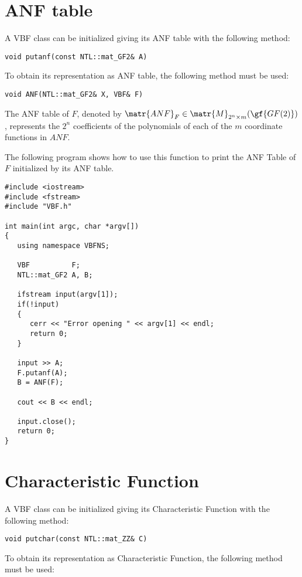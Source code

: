 \section{ANF table}

A VBF class can be initialized giving its ANF table with the following method:

\begin{verbatim}
void putanf(const NTL::mat_GF2& A)
\end{verbatim}

To obtain its representation as ANF table, the following method must be used:

\begin{verbatim}
void ANF(NTL::mat_GF2& X, VBF& F)
\end{verbatim}

The ANF table of $F$, denoted by $\matr{ANF}_F \in \matr{M}_{2^n \times m}(\gf{GF(2)})$, represents the $2^n$ coefficients of the polynomials of each of the $m$ coordinate functions in $ANF$.

The following program shows how to use this function to print the ANF Table of $F$ initialized by its ANF table.

\begin{verbatim}
#include <iostream>
#include <fstream>
#include "VBF.h"

int main(int argc, char *argv[])
{
   using namespace VBFNS;

   VBF          F;
   NTL::mat_GF2 A, B;

   ifstream input(argv[1]);
   if(!input)
   {
      cerr << "Error opening " << argv[1] << endl;
      return 0;
   }

   input >> A;
   F.putanf(A);
   B = ANF(F);

   cout << B << endl;

   input.close();
   return 0;
}
\end{verbatim}

\section{Characteristic Function}

A VBF class can be initialized giving its Characteristic Function with the following method:

\begin{verbatim}
void putchar(const NTL::mat_ZZ& C)
\end{verbatim}

To obtain its representation as Characteristic Function, the following method must be used:

